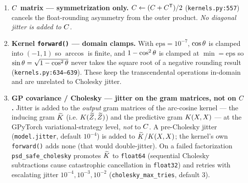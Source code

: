 \begin{enumerate}[leftmargin=1.6em]
\item \textbf{$C$ matrix --- symmetrization only.}
  $C\leftarrow(C+C^{\mathsf{T}})/2$ (\texttt{kernels.py:557}) cancels the
  float-rounding asymmetry from the outer product. \emph{No diagonal jitter is added
  to $C$.}
\item \textbf{Kernel \texttt{forward()} --- domain clamps.} With
  $\text{eps}=10^{-7}$, $\cos\theta$ is clamped into $(-1,1)$ so $\arccos$ is finite,
  and $1-\cos^2\theta$ is clamped at $\min=\text{eps}$ so $\sin\theta=\sqrt{1-\cos^2\theta}$
  never takes the square root of a negative rounding result (\texttt{kernels.py:634--639}).
  These keep the transcendental operations in-domain and are unrelated to Cholesky
  jitter.
\item \textbf{GP covariance / Cholesky --- jitter on the gram matrices, not on
  $C$.} Jitter is added to the \emph{output} gram matrices of the arc-cosine
  kernel --- the inducing gram $\widetilde{K}$ (i.e. $K(\widetilde{Z},\widetilde{Z})$) and the predictive
  gram $K(X,X)$ --- at the GPyTorch variational-strategy level, \emph{not} to
  $C$. A pre-Cholesky jitter (\texttt{model.jitter}, default $10^{-4}$) is added
  to $\widetilde{K}$/$K(X,X)$; the kernel's own \texttt{forward()} adds none (that would
  double-jitter). On a failed factorization \texttt{psd\_safe\_cholesky} promotes
  $\widetilde{K}$ to \texttt{float64} (sequential Cholesky subtractions cause catastrophic
  cancellation in \texttt{float32}) and retries with escalating jitter
  $10^{-4},10^{-3},10^{-2}$ (\texttt{cholesky\_max\_tries}, default 3).
\end{enumerate}

